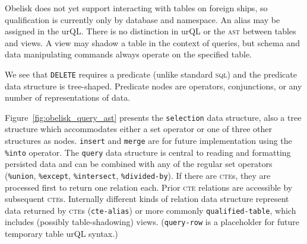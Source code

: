 \documentclass[twoside]{article}
\begin{document}
Obelisk does not yet support interacting with tables on foreign ships, so qualification is currently only by database and namespace. An alias may be assigned in the urQL. There is no distinction in urQL or the \textsc{ast} between tables and views. A view may shadow a table in the context of queries, but schema and data manipulating commands always operate on the specified table.

We see that \lstinline[style=inlinecode]{DELETE} requires a predicate (unlike standard \textsc{sql}) and the predicate data structure is tree-shaped. Predicate nodes are operators, conjunctions, or any number of representations of data.

Figure~\ref{fig:obelisk_query_ast} presents the \lstinline[style=inlinecode]{selection} data structure, also a tree structure which accommodates either a set operator or one of three other structures as nodes. \lstinline[style=inlinecode]{insert} and \lstinline[style=inlinecode]{merge} are for future implementation using the \lstinline[style=inlinecode]{%into} operator. The \lstinline[style=inlinecode]{query} data structure is central to reading and formatting persisted data and can be combined with any of the regular set operators (\lstinline[style=inlinecode]{%union}, \lstinline[style=inlinecode]{%except}, \lstinline[style=inlinecode]{%intersect}, \lstinline[style=inlinecode]{%divided-by}). If there are \textsc{cte}s, they are processed first to return one relation each. Prior \textsc{cte} relations are accessible by subsequent \textsc{cte}s. Internally different kinds of relation data structure represent data returned by \textsc{cte}s (\lstinline[style=inlinecode]{cte-alias}) or more commonly \lstinline[style=inlinecode]{qualified-table}, which includes (possibly table-shadowing) views. (\lstinline[style=inlinecode]{query-row} is a placeholder for future temporary table urQL syntax.)
\end{document}
